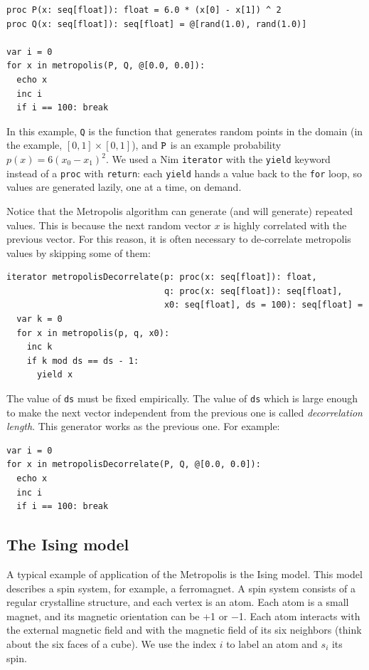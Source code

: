 \documentclass[justified, sixbynine]{tufte-book}
\def\ft{\small\tt}
\theoremstyle{plain}%
\newtheorem * {corollary}{Corollary}
\theoremstyle{definition}
\theoremstyle{remark}
\newtheorem * {remark}{Remark}
\newtheorem * {note}{Note}
\begin{document}
\begin{fullwidth}
\begin{lstlisting}
proc P(x: seq[float]): float = 6.0 * (x[0] - x[1]) ^ 2
proc Q(x: seq[float]): seq[float] = @[rand(1.0), rand(1.0)]

var i = 0
for x in metropolis(P, Q, @[0.0, 0.0]):
  echo x
  inc i
  if i == 100: break
\end{lstlisting}

In this example, {\ft Q} is the function that generates random points in the domain (in the example, $[0, 1]\times[0, 1]$), and ${\ft P}$ is an example probability $p(x) = 6(x_0-x_1)^2$. We used a Nim {\ft iterator} with the {\ft yield} keyword instead of a {\ft proc} with {\ft return}: each {\ft yield} hands a value back to the {\ft for} loop, so values are generated lazily, one at a time, on demand.


Notice that the Metropolis algorithm can generate (and will generate) repeated values. This is because the next random vector $x$ is highly correlated with the previous vector. For this reason, it is often necessary to de-correlate metropolis values by skipping some of them:

\begin{lstlisting}
iterator metropolisDecorrelate(p: proc(x: seq[float]): float,
                               q: proc(x: seq[float]): seq[float],
                               x0: seq[float], ds = 100): seq[float] =
  var k = 0
  for x in metropolis(p, q, x0):
    inc k
    if k mod ds == ds - 1:
      yield x
\end{lstlisting}

The value of {\ft ds} must be fixed empirically. The value of {\ft ds} which is large enough to make the next vector independent from the previous one is called {\it decorrelation length}. This generator works as the previous one. For example:

\begin{lstlisting}
var i = 0
for x in metropolisDecorrelate(P, Q, @[0.0, 0.0]):
  echo x
  inc i
  if i == 100: break
\end{lstlisting}


\subsection{The Ising model}

A typical example of application of the Metropolis is the Ising model. This model describes a spin system, for example, a ferromagnet. A spin system consists of a regular crystalline structure, and each vertex is an atom. Each atom is a small magnet, and its magnetic orientation can be +1 or $-$1. Each atom interacts with the external magnetic field and with the magnetic field of its six neighbors (think about the six faces of a cube). We use the index $i$ to label an atom and $s_i$ its spin.


\end{fullwidth}
\end{document}

